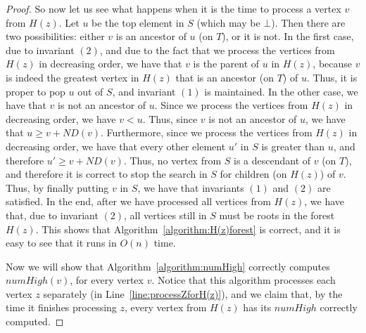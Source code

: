 \documentclass[11pt,a4paper]{article}
\begin{document}
\begin{proof}
So now let us see what happens when it is the time to process a vertex $v$ from $H(z)$. Let $u$ be the top element in $S$ (which may be $\bot$). Then there are two possibilities: either $v$ is an ancestor of $u$ (on $T$), or it is not. In the first case, due to invariant $(2)$, and due to the fact that we process the vertices from $H(z)$ in decreasing order, we have that $v$ is the parent of $u$ in $H(z)$, because $v$ is indeed the greatest vertex in $H(z)$ that is an ancestor (on $T$) of $u$. Thus, it is proper to pop $u$ out of $S$, and invariant $(1)$ is maintained. In the other case, we have that $v$ is not an ancestor of $u$. Since we process the vertices from $H(z)$ in decreasing order, we have $v<u$. Thus, since $v$ is not an ancestor of $u$, we have that $u\geq v+\mathit{ND}(v)$. Furthermore, since we process the vertices from $H(z)$ in decreasing order, we have that every other element $u'$ in $S$ is greater than $u$, and therefore $u'\geq v+\mathit{ND}(v)$. Thus, no vertex from $S$ is a descendant of $v$ (on $T$), and therefore it is correct to stop the search in $S$ for children (on $H(z)$) of $v$. Thus, by finally putting $v$ in $S$, we have that invariants $(1)$ and $(2)$ are satisfied. In the end, after we have processed all vertices from $H(z)$, we have that, due to invariant $(2)$, all vertices still in $S$ must be roots in the forest $H(z)$. This shows that Algorithm~\ref{algorithm:H(z)forest} is correct, and it is easy to see that it runs in $O(n)$ time.

Now we will show that Algorithm~\ref{algorithm:numHigh} correctly computes $\mathit{numHigh}(v)$, for every vertex $v$. Notice that this algorithm processes each vertex $z$ separately (in Line~\ref{line:processZforH(z)}), and we claim that, by the time it finishes processing $z$, every vertex from $H(z)$ has its $\mathit{numHigh}$ correctly computed.


\end{proof}
\end{document}
